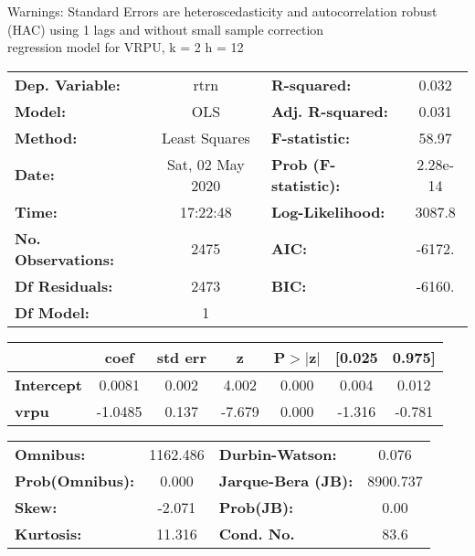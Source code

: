 Warnings: \newline
 [1] Standard Errors are heteroscedasticity and autocorrelation robust (HAC) using 1 lags and without small sample correction\\ 

regression model for VRPU, k = 2 h = 12\begin{center}
\begin{tabular}{lclc}
\toprule
\textbf{Dep. Variable:}    &       rtrn       & \textbf{  R-squared:         } &     0.032   \\
\textbf{Model:}            &       OLS        & \textbf{  Adj. R-squared:    } &     0.031   \\
\textbf{Method:}           &  Least Squares   & \textbf{  F-statistic:       } &     58.97   \\
\textbf{Date:}             & Sat, 02 May 2020 & \textbf{  Prob (F-statistic):} &  2.28e-14   \\
\textbf{Time:}             &     17:22:48     & \textbf{  Log-Likelihood:    } &    3087.8   \\
\textbf{No. Observations:} &        2475      & \textbf{  AIC:               } &    -6172.   \\
\textbf{Df Residuals:}     &        2473      & \textbf{  BIC:               } &    -6160.   \\
\textbf{Df Model:}         &           1      & \textbf{                     } &             \\
\bottomrule
\end{tabular}
\begin{tabular}{lcccccc}
                   & \textbf{coef} & \textbf{std err} & \textbf{z} & \textbf{P$> |$z$|$} & \textbf{[0.025} & \textbf{0.975]}  \\
\midrule
\textbf{Intercept} &       0.0081  &        0.002     &     4.002  &         0.000        &        0.004    &        0.012     \\
\textbf{vrpu}      &      -1.0485  &        0.137     &    -7.679  &         0.000        &       -1.316    &       -0.781     \\
\bottomrule
\end{tabular}
\begin{tabular}{lclc}
\textbf{Omnibus:}       & 1162.486 & \textbf{  Durbin-Watson:     } &    0.076  \\
\textbf{Prob(Omnibus):} &   0.000  & \textbf{  Jarque-Bera (JB):  } & 8900.737  \\
\textbf{Skew:}          &  -2.071  & \textbf{  Prob(JB):          } &     0.00  \\
\textbf{Kurtosis:}      &  11.316  & \textbf{  Cond. No.          } &     83.6  \\
\bottomrule
\end{tabular}
\end{center}

